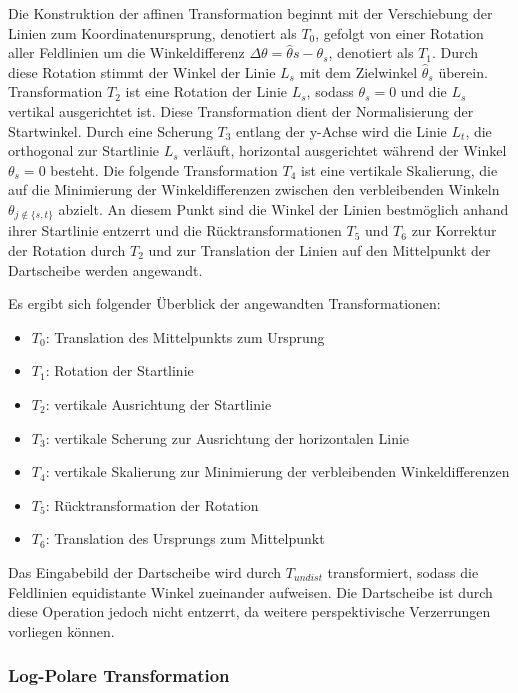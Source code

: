 Die Konstruktion der affinen Transformation beginnt mit der Verschiebung der Linien zum Koordinatenursprung, denotiert als $T_0$, gefolgt von einer Rotation aller Feldlinien um die Winkeldifferenz $\Delta \theta = \hat\theta{s} - \theta_s$, denotiert als $T_1$. Durch diese Rotation stimmt der Winkel der Linie $L_s$ mit dem Zielwinkel $\hat{\theta}_s$ überein. Transformation $T_2$ ist eine Rotation der Linie $L_s$, sodass $\theta_s = 0$ und die $L_s$ vertikal ausgerichtet ist. Diese Transformation dient der Normalisierung der Startwinkel. Durch eine Scherung $T_3$ entlang der y-Achse wird die Linie $L_t$, die orthogonal zur Startlinie $L_s$ verläuft, horizontal ausgerichtet während der Winkel $\theta_s = 0$ besteht. Die folgende Transformation $T_4$ ist eine vertikale Skalierung, die auf die Minimierung der Winkeldifferenzen zwischen den verbleibenden Winkeln $\theta_{j \notin \{s, t\}}$ abzielt. An diesem Punkt sind die Winkel der Linien bestmöglich anhand ihrer Startlinie entzerrt und die Rücktransformationen $T_5$ und $T_6$ zur Korrektur der Rotation durch $T_2$ und zur Translation der Linien auf den Mittelpunkt der Dartscheibe werden angewandt.

Es ergibt sich folgender Überblick der angewandten Transformationen:

\begin{itemize}
    \item $T_0$: Translation des Mittelpunkts zum Ursprung
    \item $T_1$: Rotation der Startlinie
    \item $T_2$: vertikale Ausrichtung der Startlinie
    \item $T_3$: vertikale Scherung zur Ausrichtung der horizontalen Linie
    \item $T_4$: vertikale Skalierung zur Minimierung der verbleibenden Winkeldifferenzen
    \item $T_5$: Rücktransformation der Rotation
    \item $T_6$: Translation des Ursprungs zum Mittelpunkt
\end{itemize}

Das Eingabebild der Dartscheibe wird durch $T_{undist}$ transformiert, sodass die Feldlinien equidistante Winkel zueinander aufweisen. Die Dartscheibe ist durch diese Operation jedoch nicht entzerrt, da weitere perspektivische Verzerrungen vorliegen können.

\subsubsection{Log-Polare Transformation}
\label{sec:impl:cv:orient:logpolar}

